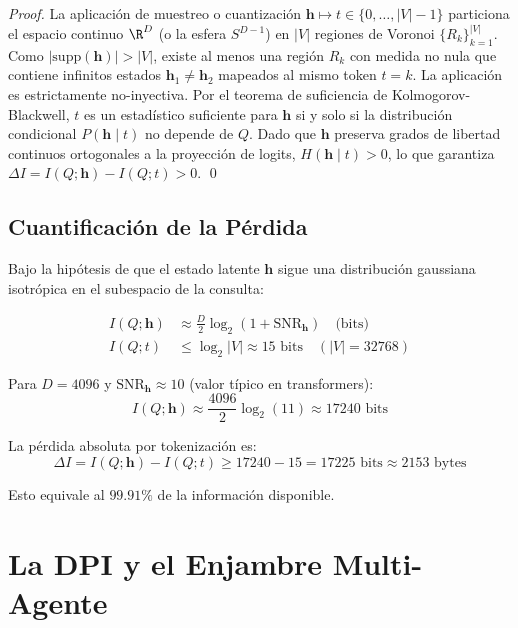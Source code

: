 \begin{proof}
La aplicación de muestreo o cuantización $\mathbf{h} \mapsto t \in \{0, \dots, |V|-1\}$ 
particiona el espacio continuo $\R^D$ (o la esfera $S^{D-1}$) en $|V|$ regiones de Voronoi 
$\{R_k\}_{k=1}^{|V|}$. Como $|\text{supp}(\mathbf{h})| > |V|$, existe al menos una región $R_k$ 
con medida no nula que contiene infinitos estados $\mathbf{h}_1 \neq \mathbf{h}_2$ mapeados al 
mismo token $t = k$. La aplicación es estrictamente no-inyectiva. Por el teorema de suficiencia 
de Kolmogorov-Blackwell, $t$ es un estadístico suficiente para $\mathbf{h}$ si y solo si la 
distribución condicional $P(\mathbf{h} \mid t)$ no depende de $Q$. Dado que $\mathbf{h}$ preserva 
grados de libertad continuos ortogonales a la proyección de logits, $H(\mathbf{h} \mid t) > 0$, 
lo que garantiza $\Delta I = I(Q; \mathbf{h}) - I(Q; t) > 0$. \qed
\end{proof}

\subsection{Cuantificación de la Pérdida}

Bajo la hipótesis de que el estado latente $\mathbf{h}$ sigue una distribución
gaussiana isotrópica en el subespacio de la consulta:

\begin{align}
I(Q; \mathbf{h}) &\approx \frac{D}{2} \log_2\left(1 + \text{SNR}_{\mathbf{h}}\right) \quad \text{(bits)} \\
I(Q; t) &\le \log_2 |V| \approx 15 \text{ bits} \quad (|V| = 32768)
\end{align}

Para $D = 4096$ y $\text{SNR}_{\mathbf{h}} \approx 10$ (valor típico en transformers):
\begin{equation}
I(Q; \mathbf{h}) \approx \frac{4096}{2} \log_2(11) \approx 17240 \text{ bits}
\end{equation}

La pérdida absoluta por tokenización es:
\begin{equation}
\Delta I = I(Q; \mathbf{h}) - I(Q; t) \ge 17240 - 15 = 17225 \text{ bits} \approx 2153 \text{ bytes}
\end{equation}

Esto equivale al $99.91\%$ de la información disponible.

\section{La DPI y el Enjambre Multi-Agente}

